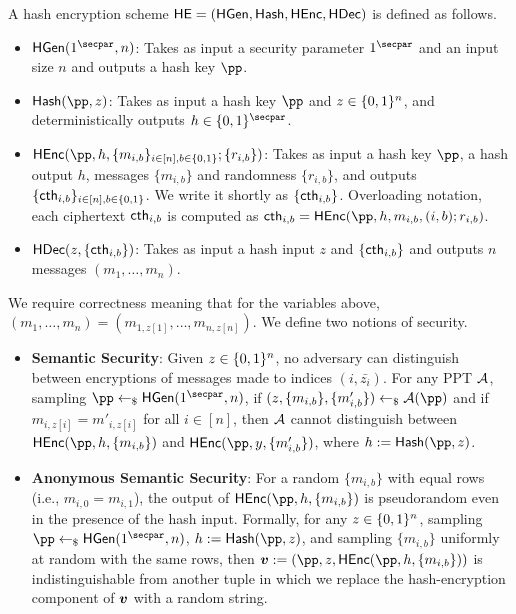 \begin{definition}
A hash encryption scheme $\mathsf{HE} = (\mathsf{HGen}, \mathsf{Hash}, \mathsf{HEnc}, \mathsf{HDec})$ is defined as follows.
\begin{itemize}
    \item $\HGen(1^\secpar , n)$: Takes as input a security parameter $1^\secpar$ and an input size $n$ and outputs a hash key $\pp$.
    \item $\Hash(\pp, z)$: Takes as input a hash key $\pp$ and $z \in \{0,1\}^n$, and deterministically outputs $h \in \bits^\secpar$. 
    \item $\HEnc(\pp, h, \{m_{i,b} \}_{i \in [n], b \in \bits} ; \{r_{i,b} \})$: Takes as input  a hash key $\pp$, a hash output $h$,  messages $\{ m_{i,b}\}$ and randomness $\{r_{i,b} \}$,  and outputs $\{ \mathsf{cth}_{i,b}\}_{i \in [n], b \in \{0,1\}}$. We write it shortly as $\{ \mathsf{cth}_{i,b}\}$. Overloading notation, each ciphertext $\mathsf{cth}_{i,b}$ is computed as $\cth_{i,b} = \HEnc(\pp, h , m_{i,b} , (i,b); r_{i,b})$.
    \item $\mathsf{HDec}(z, \{ \mathsf{cth}_{i,b} \})$: Takes as input a hash input $z$ and $\{\mathsf{cth}_{i,b} \}$ and outputs $n$ messages $(m_1, \dots, m_n)$.
\end{itemize}
We require correctness meaning that  for the variables above,  $(m_1, \dots , m_n) = (m_{1, z[1]} , \dots , m_{n , z[n]})$. We define two notions of security.
\begin{itemize}
    \item \textbf{Semantic Security}: Given  $z \in \{0,1\}^n$, no adversary can distinguish between encryptions of messages  made to indices $(i, \bar{z_{i}})$. For any PPT $\mathcal{A}$, sampling $\pp \pick \HGen(1^\secpar , n)$, if $(z , \{m_{i,b}\} , \{m'_{i,b} \}) \pick \mc{A}(\pp)$ and if $m_{i, z[i]} = m'_{i, z[i]}$ for all $i \in [n]$, then $\mathcal{A}$ cannot distinguish between $\HEnc(\pp, h, \{m_{i,b} \})$ and $\HEnc(\pp, y, \{m'_{i,b} \})$, where $h := \Hash(\pp, z)$.
    \item \textbf{Anonymous Semantic Security}: For a random $\{ m_{i,b}\}$ with equal rows (i.e., $m_{i,0} = m_{i, 1}$), the output of  $\HEnc(\pp, h, \{m_{i,b}\})$ is pseudorandom even in the presence of the hash input. Formally, for any $z \in \{0,1\}^n$,  sampling $\pp \pick \HGen(1^\secpar, n)$, $h:= \Hash(\pp, z)$, and sampling $\{m_{i,b}\}$ uniformly at random with the same rows, then $\bo{v} := (\pp, z, \HEnc(\pp, h, \{m_{i,b}\}) )$ is indistinguishable from another tuple in which we replace the hash-encryption component of $\boldsymbol{v}$ with a  random string.
\end{itemize}
\end{definition}

